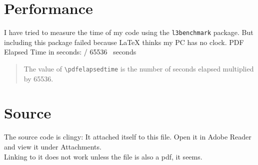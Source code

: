 \documentclass{article} \usepackage[utf8]{inputenc}
\newcommand{\code}[1]{\colorbox{codebggray}{{\texttt{#1}}}}
\begin{document}
\section{Performance}
I have tried to measure the time of my code using the \code{l3benchmark} package. But including this package failed because LaTeX thinks my PC has no clock.
PDF Elapsed Time in seconds: \the\numexpr \pdfelapsedtime / 65536 \relax ~seconds
\begin{myquote}\begin{quote}
The value of \code{\textbackslash pdfelapsedtime} is the number of seconds elapsed multiplied by 65536. 
\end{quote}\end{myquote}

\section{Source}
The source code is clingy: It attached itself to this file. Open it in Adobe Reader and view it under Attachments.\\
Linking to it does not work unless the file is also a pdf, it seems.
\end{document}
